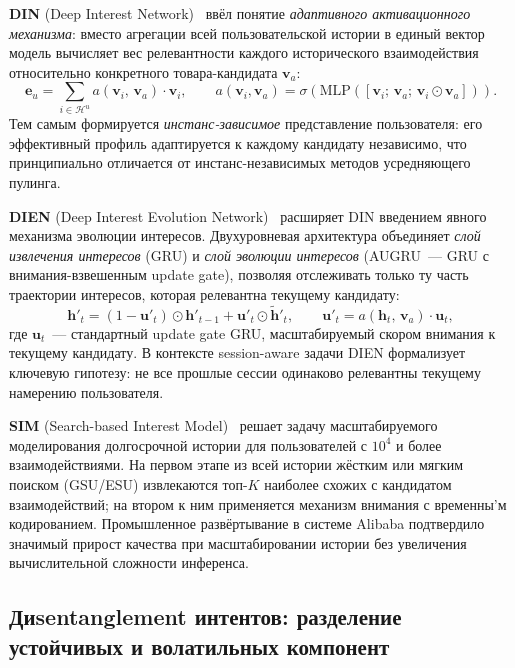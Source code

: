 \textbf{DIN} (Deep Interest Network)~\cite{zhou2018din} ввёл понятие \textit{адаптивного активационного механизма}: вместо агрегации всей пользовательской истории в единый вектор модель вычисляет вес релевантности каждого исторического взаимодействия относительно конкретного товара-кандидата $\mathbf{v}_a$:
\begin{equation}
    \mathbf{e}_u = \sum_{i \in \mathcal{H}^u} a(\mathbf{v}_i,\, \mathbf{v}_a) \cdot \mathbf{v}_i,
    \qquad
    a(\mathbf{v}_i, \mathbf{v}_a) = \sigma\!\left(\mathrm{MLP}([\mathbf{v}_i;\, \mathbf{v}_a;\, \mathbf{v}_i \odot \mathbf{v}_a])\right).
\end{equation}
Тем самым формируется \textit{инстанс-зависимое} представление пользователя: его эффективный профиль адаптируется к каждому кандидату независимо, что принципиально отличается от инстанс-независимых методов усредняющего пулинга.

\textbf{DIEN} (Deep Interest Evolution Network)~\cite{zhou2019dien} расширяет DIN введением явного механизма эволюции интересов. Двухуровневая архитектура объединяет \textit{слой извлечения интересов} (GRU) и \textit{слой эволюции интересов} (AUGRU~--- GRU с внимания-взвешенным update gate), позволяя отслеживать только ту часть траектории интересов, которая релевантна текущему кандидату:
\begin{equation}
    \mathbf{h}'_t = (1 - \mathbf{u}'_t) \odot \mathbf{h}'_{t-1} + \mathbf{u}'_t \odot \tilde{\mathbf{h}}'_t,
    \qquad
    \mathbf{u}'_t = a(\mathbf{h}_t,\, \mathbf{v}_a) \cdot \mathbf{u}_t,
\end{equation}
где $\mathbf{u}_t$~--- стандартный update gate GRU, масштабируемый скором внимания к текущему кандидату. В контексте session-aware задачи DIEN формализует ключевую гипотезу: не все прошлые сессии одинаково релевантны текущему намерению пользователя.

\textbf{SIM} (Search-based Interest Model)~\cite{pi2020sim} решает задачу масштабируемого моделирования долгосрочной истории для пользователей с $10^4$ и более взаимодействиями. На первом этапе из всей истории жёстким или мягким поиском (GSU/ESU) извлекаются топ-$K$ наиболее схожих с кандидатом взаимодействий; на втором к ним применяется механизм внимания с временны'м кодированием. Промышленное развёртывание в системе Alibaba подтвердило значимый прирост качества при масштабировании истории без увеличения вычислительной сложности инференса.

\subsection{Диsentanglement интентов: разделение устойчивых и волатильных компонент}
\label{subsec:ch1:disentangle}

